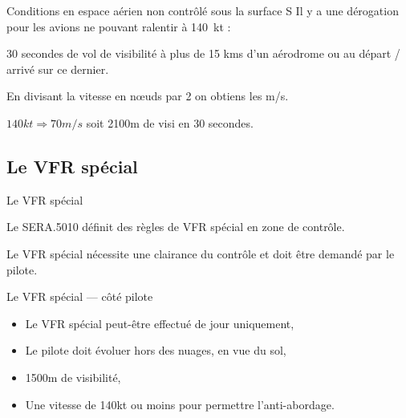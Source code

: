 \documentclass{beamer}
\begin{document}
\begin{frame}{Conditions en espace aérien non contrôlé sous la surface S} 
  Il y a une dérogation pour les avions ne pouvant ralentir à 140 kt :

  \vspace*{1em} \pause

  30 secondes de vol de visibilité à plus de 15 kms d'un aérodrome ou
  au départ / arrivé sur ce dernier.

  \vspace*{1em} \pause
  En divisant la vitesse en nœuds par 2 on obtiens les m/s.

  \vspace*{1em} \pause
  $140 kt \Rightarrow 70m/s$ soit 2100m de visi en 30 secondes.

  \vspace*{1em} \pause
  
\end{frame}

\subsection{Le VFR spécial}

\begin{frame}{Le VFR spécial}

  Le SERA.5010 définit des règles de VFR spécial en zone de contrôle.
  \pause

  Le VFR spécial nécessite une clairance du contrôle et doit être
  demandé par le pilote.

\end{frame}
  
\begin{frame}{Le VFR spécial — côté pilote}

  \begin{itemize}
    \item Le VFR spécial peut-être effectué de jour uniquement, \pause
    \item Le pilote doit évoluer hors des nuages, en vue du sol, \pause
    \item 1500m de visibilité, \pause
    \item Une vitesse de 140kt ou moins pour permettre l'anti-abordage.
  \end{itemize}

\end{frame}
  
\end{document}
